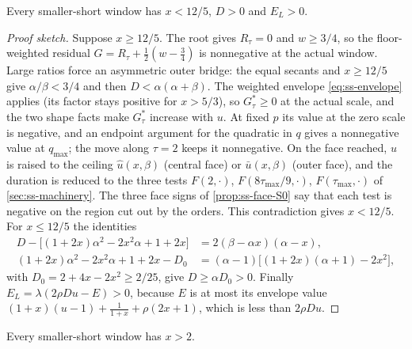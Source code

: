 \begin{proposition}[Gate S0]\label{prop:ss-S0}
Every smaller-short window has $x<12/5$, $D>0$ and $E_L>0$.
\end{proposition}

\begin{proof}[Proof sketch]
Suppose $x\ge12/5$. The root gives $R_\tau=0$ and $w\ge3/4$, so the floor-weighted residual
$G=R_\tau+\frac12(w-\frac34)$ is nonnegative at the actual window. Large ratios force an asymmetric
outer bridge: the equal secants and $x\ge12/5$ give $\alpha/\beta<3/4$ and then
$D<\alpha(\alpha+\beta)$. The weighted envelope \eqref{eq:ss-envelope} applies (its factor stays
positive for $x>5/3$), so $G^*_\tau\ge0$ at the actual scale, and the two shape facts make
$G^*_\tau$ increase with $u$. At fixed $p$ its value at the zero scale is negative, and an endpoint argument
for the quadratic in $q$ gives a nonnegative value at $q_{\max}$; the move along $\tau=2$ keeps it
nonnegative. On the face reached, $u$ is raised to the ceiling $\hat u(x,\beta)$ (central face) or
$\bar u(x,\beta)$ (outer face), and the duration is reduced to the three tests $F(2,\cdot)$,
$F(8\tau_{\max}/9,\cdot)$, $F(\tau_{\max},\cdot)$ of \cref{sec:ss-machinery}. The three face
signs of \cref{prop:ss-face-S0} say that each test is negative on the region cut out by the
orders. This
contradiction gives $x<12/5$. For $x\le12/5$ the identities
\begin{align*}
  D-\bigl[(1+2x)\alpha^2-2x^2\alpha+1+2x\bigr]&=2(\beta-\alpha x)(\alpha-x),\\
  (1+2x)\alpha^2-2x^2\alpha+1+2x-D_0&=(\alpha-1)\bigl[(1+2x)(\alpha+1)-2x^2\bigr],
\end{align*}
with $D_0=2+4x-2x^2\ge2/25$, give $D\ge\alpha D_0>0$. Finally
$E_L=\lambda(2\rho Du-E)>0$, because $E$ is at most its envelope value
$(1+x)(u-1)+\frac1{1+x}+\rho(2x+1)$, which is less than $2\rho Du$.
\end{proof}

\begin{proposition}[Gate S1]\label{prop:ss-S1}
Every smaller-short window has $x>2$.
\end{proposition}

